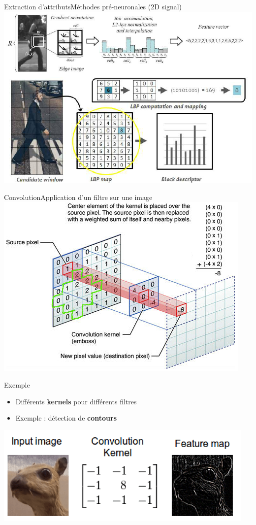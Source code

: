 \documentclass[compress]{beamer}
\begin{document}
\begin{frame}{Extraction d'attributs}{Méthodes pré-neuronales (2D signal)}
\centering
\includegraphics[width=0.9\linewidth]{resources/beatles}
\end{frame}

\begin{frame}{Convolution}{Application d'un filtre sur une image}
	\centering
	\includegraphics[width=0.95\linewidth]{resources/clem/convolution}
\end{frame}

\begin{frame}{Exemple}
  \begin{itemize}
  	\item Différents \textbf{\color{fibeamer@orange}kernels} pour différents filtres
  	\item Exemple : détection de \textbf{\color{fibeamer@orange}contours}
  \end{itemize}
  \bigskip
	\centering
	\includegraphics[width=1\linewidth]{resources/clem/rat}
\end{frame}
\end{document}
